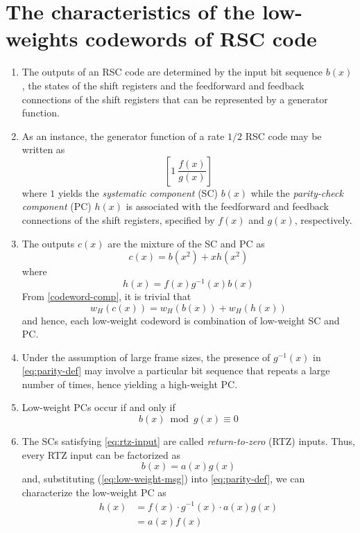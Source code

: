 \section{The characteristics of the low-weights codewords of RSC code}
\label{sec2}
\begin{enumerate}
\item The outputs of an RSC code are determined by the input bit sequence $b(x)$, the states of the shift registers and the feedforward and feedback connections of the shift registers that can be represented by a generator function. 

\item As an instance,  the generator function of a rate $1/2$ RSC code may be written as  $$\left[1 ~\frac{f(x)}{g(x)}\right]$$ where $1$ yields the \textit{systematic  component} (SC) $b(x)$ while the \textit{parity-check component} (PC) $h(x)$ is associated with the feedforward and feedback connections of the shift registers, specified by $f(x)$ and $g(x)$, respectively. 

\item The outputs $c(x)$ are the mixture of the SC and PC as
\begin{equation}
c(x) = b(x^2)+xh(x^2)
\label{codeword-comp}
\end{equation}
where 
\begin{equation}
h(x) =f(x)g^{-1}(x)b(x)
\label{eq:parity-def}
\end{equation}
From \eqref{codeword-comp}, it is trivial that
\begin{equation}
w_H(c(x))=w_H(b(x)) + w_H(h(x))
\label{eq:cw-weight}
\end{equation}
and hence, each low-weight codeword is combination of low-weight SC and PC.

\item Under the assumption of large frame sizes, the presence of $g^{-1}(x)$  in \eqref{eq:parity-def} may involve a particular bit sequence that repeats a large number of times, hence yielding a high-weight PC. 

\item Low-weight PCs occur if and only if
\begin{equation}
b(x) \bmod g(x) \equiv 0
\label{eq:rtz-input}
\end{equation}

\item The SCs satisfying \eqref{eq:rtz-input} are called \textit{return-to-zero} (RTZ) inputs. Thus, every RTZ input can be factorized as  
\begin{equation}
b(x) =a(x)g(x)
\label{eq:low-weight-msg}
\end{equation}
and, substituting (\ref{eq:low-weight-msg}) into \eqref{eq:parity-def}, we can characterize the low-weight PC as
\begin{equation}
\begin{split}
h(x)&=f(x)\cdot g^{-1}(x)\cdot a(x)g(x)\\
&=a(x)f(x)
\end{split}
\label{eq:low-weight-parity}
\end{equation}


\end{enumerate}
